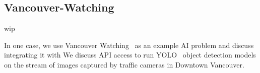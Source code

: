 \subsection{Vancouver-Watching}

wip

In one case, we use Vancouver Watching~\cite{vanwatch} as an example AI problem and discuss integrating it with  We discuss API access to run YOLO~\cite{YOLO} object detection models on the stream of images captured by traffic cameras in Downtown Vancouver.
